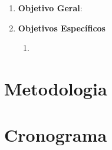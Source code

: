 \begin{enumerate}
	\item \textbf{Objetivo Geral}:

	\item \textbf{Objetivos Específicos}
	\begin{enumerate}
		\item 
	\end{enumerate}
\end{enumerate}

\section*{Metodologia}

\section*{Cronograma}

\postextual

 


